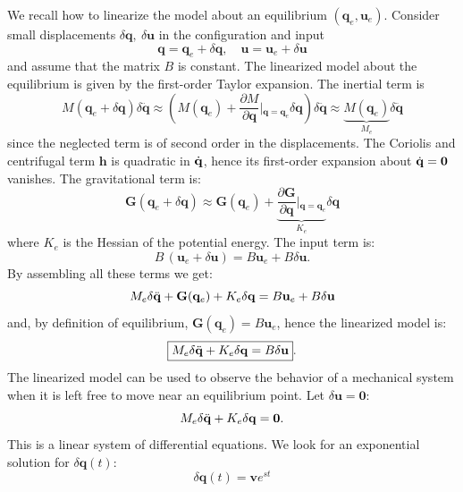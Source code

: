 \documentclass[10pt, a4paper]{report}
\newcommand{\q}{{\mathbf q}}
\begin{document}
We recall how to linearize the model about an equilibrium $(\q_e,\mathbf u_e)$. Consider small displacements $\delta\q, \ \delta\mathbf u $ in the configuration and input
$$\q=\q_e+\delta\q, \quad \mathbf u=\mathbf u_e+\delta\mathbf u$$
and assume that the matrix $B$ is constant. The linearized model about the equilibrium is given by the first-order Taylor expansion. The inertial term is 
\begin{equation}
    M(\mathbf{q}_e + \delta\mathbf{q})\delta\ddot{\mathbf{q}} \approx \left( M(\mathbf{q}_e) + \frac{\partial M}{\partial \mathbf{q}}\Big\vert{}_{\q=\mathbf{q}_e}\delta\mathbf{q} \right)\delta\ddot{\mathbf{q}} \approx \underbrace{M(\mathbf{q}_e)}_{M_e}\delta\ddot{\mathbf{q}}
\end{equation}
since the neglected term is of second order in the displacements. The Coriolis and centrifugal term $\mathbf h$ is quadratic in ${\dot{\mathbf q}}$, hence its first-order expansion about ${\dot{\mathbf q}}=\mathbf 0$ vanishes. The gravitational term is:\begin{equation}
    \mathbf{G}(\mathbf{q}_e + \delta\mathbf{q}) \approx \mathbf{G}(\mathbf{q}_e) + \underbrace{\frac{\partial \mathbf{G}}{\partial \mathbf{q}}\Big\vert{}_{\q=\q_e}}_{K_e}\delta\mathbf{q}
\end{equation}
where $K_e$ is the Hessian of the potential energy. The input term is:\begin{equation}
    B\,(\mathbf{u}_e + \delta\mathbf{u}) = B\mathbf{u}_e + B\delta\mathbf{u}.
\end{equation}
By assembling all these terms we get:
\begin{equation}
    M_e\delta\ddq+\mathbf G(\q_e)+K_e\delta\q=B\mathbf u_e+B\delta\mathbf u 
\end{equation}
and, by definition of equilibrium, $\mathbf G(\q_e)=B\mathbf u_e$, hence the linearized model is:
\begin{equation}
   \boxed{M_e\delta\ddq+K_e\delta\q=B\delta\mathbf u }.
\end{equation}
The linearized model can be used to observe the behavior of a mechanical system when 
it is left free to move near an equilibrium point. Let $\delta\mathbf u=\mathbf 0$:\begin{equation}
    M_e\delta\ddq+K_e\delta\q=\mathbf 0.
\end{equation}
This is a linear system of differential equations. We look for an exponential solution for $\delta \q(t)$:\begin{equation}
    \delta\mathbf{q}(t) = \mathbf{v} e^{st}
\end{equation}
\end{document}
